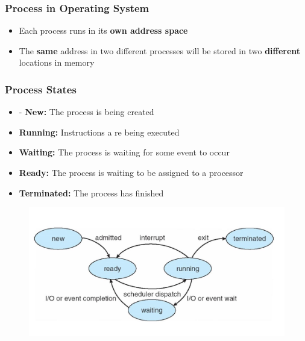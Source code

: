 \documentclass[11pt]{article}
\theoremstyle{definition}
\begin{document}
        \subsubsection{Process in Operating System}
        \begin{itemize}
            \item Each process runs in its \textbf{own address space}
            \item The \textbf{same} address in two different processes will be stored in two \textbf{different} locations in memory
        \end{itemize}
        \subsubsection{Process States}
            \begin{itemize}
                \item - \textbf{New:} The process is being created
                \item \textbf{Running:} Instructions a re being executed
                \item \textbf{Waiting:} The process is waiting for some event to occur
                \item \textbf{Ready:} The process is waiting to be assigned to a processor
                \item \textbf{Terminated:} The process has finished
            \end{itemize}
          \begin{figure}[htbp]
            \centering
                \includegraphics[width=0.80\linewidth]{img/process_states.jpg}
                \label{fig:enter-label}
            \end{figure}
\end{document}
